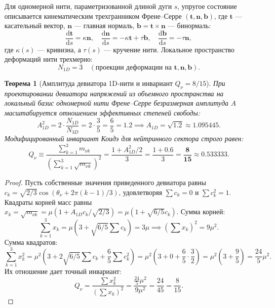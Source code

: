 \documentclass[11pt,a4paper]{article}
\newtheorem{theorem}{Теорема}
\theoremstyle{definition}
\theoremstyle{remark}
\begin{document}
Для одномерной нити, параметризованной длиной дуги $s$, упругое состояние описывается кинематическим трехгранником Френе--Серре $(\mathbf{t}, \mathbf{n}, \mathbf{b})$, где $\mathbf{t}$ — касательный вектор, $\mathbf{n}$ — главная нормаль, $\mathbf{b} = \mathbf{t} \times \mathbf{n}$ — бинормаль:
\begin{equation}
    \frac{\mathrm{d}\mathbf{t}}{\mathrm{d}s} = \kappa \mathbf{n}, \quad 
    \frac{\mathrm{d}\mathbf{n}}{\mathrm{d}s} = -\kappa \mathbf{t} + \tau \mathbf{b}, \quad 
    \frac{\mathrm{d}\mathbf{b}}{\mathrm{d}s} = -\tau \mathbf{n},
\end{equation}
где $\kappa(s)$ — кривизна, а $\tau(s)$ — кручение нити. Локальное пространство деформаций нити трехмерно:
\begin{equation}
    N_{1D} = 3 \quad (\text{проекции деформации на } \mathbf{t}, \mathbf{n}, \mathbf{b}).
\end{equation}

\begin{theorem}[Амплитуда девиатора 1D-нити и инвариант $Q_\nu = 8/15$]
\label{thm:neutrino_amplitude}
При проектировании девиатора напряжений из объемного пространства на локальный базис одномерной нити Френе--Серре безразмерная амплитуда $A$ масштабируется отношением эффективных степеней свободы:
\begin{equation}
    A_{1D}^2 = 2 \cdot \frac{N_{1D}}{N_{3D}} = 2 \cdot \frac{3}{5} = \frac{6}{5} = 1.2 \implies A_{1D} = \sqrt{1.2} \approx 1.095445.
\end{equation}
Модифицированный инвариант Коидэ для нейтринного сектора строго равен:
\begin{equation}
    Q_\nu \equiv \frac{\sum_{k=1}^3 m_{\nu k}}{\left(\sum_{k=1}^3 \sqrt{m_{\nu k}}\right)^2} = \frac{1 + A_{1D}^2 / 2}{3} = \frac{1 + 0.6}{3} = \boldsymbol{\frac{8}{15}} \approx 0.533333.
\end{equation}
\end{theorem}
\begin{proof}
Пусть собственные значения приведенного девиатора равны $c_k = \sqrt{2/3} \cos(\theta_\nu + 2\pi(k-1)/3)$, удовлетворяя $\sum c_k = 0$ и $\sum c_k^2 = 1$. Квадраты корней масс равны $x_k = \sqrt{m_{\nu k}} = \mu (1 + A_{1D} c_k / \sqrt{2/3}) = \mu (1 + \sqrt{6/5} c_k)$.
Сумма корней:
\begin{equation}
    \sum_{k=1}^3 x_k = \mu \left( 3 + \sqrt{6/5} \sum c_k \right) = 3\mu \implies \left(\sum x_k\right)^2 = 9\mu^2.
\end{equation}
Сумма квадратов:
\begin{equation}
    \sum_{k=1}^3 x_k^2 = \mu^2 \left( 3 + 2\sqrt{6/5} \sum c_k + \frac{6}{5} \sum c_k^2 \right) = \mu^2 \left( 3 + 0 + \frac{6}{5} \cdot \frac{3}{2} \right) = \mu^2 \left( 3 + \frac{9}{5} \right) = \frac{24}{5} \mu^2.
\end{equation}
Их отношение дает точный инвариант:
\begin{equation}
    Q_\nu = \frac{\sum x_k^2}{\left(\sum x_k\right)^2} = \frac{\frac{24}{5}\mu^2}{9\mu^2} = \frac{24}{45} = \frac{8}{15}.
\end{equation}
\end{proof}
\end{document}
